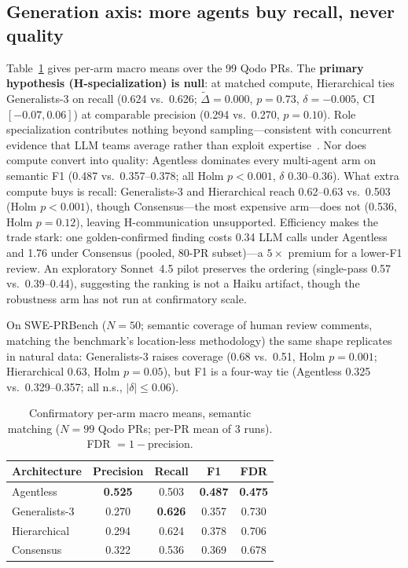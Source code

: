 \documentclass[conference]{IEEEtran}
\begin{document}
\subsection{Generation axis: more agents buy recall, never quality}
\label{sec:generation}
Table~\ref{tab:confirmatory} gives per-arm macro means over the 99 Qodo
PRs. The \textbf{primary hypothesis (H-specialization) is null}: at
matched compute, Hierarchical ties Generalists-3 on recall (0.624 vs.\
0.626; $\tilde\Delta{=}0.000$, $p{=}0.73$, $\delta{=}{-}0.005$, CI
$[-0.07, 0.06]$) at comparable precision (0.294 vs.\ 0.270, $p{=}0.10$).
Role specialization contributes nothing beyond sampling---consistent with
concurrent evidence that LLM teams average rather than exploit
expertise~\cite{pappu}. Nor does compute convert into quality: Agentless
dominates every multi-agent arm on semantic F1 (0.487 vs.\ 0.357--0.378;
all Holm $p{<}0.001$, $\delta$ 0.30--0.36). What extra compute buys is
recall: Generalists-3 and Hierarchical reach 0.62--0.63 vs.\ 0.503 (Holm
$p{<}0.001$), though Consensus---the most expensive arm---does not (0.536,
Holm $p{=}0.12$), leaving H-communication unsupported. Efficiency makes
the trade stark: one golden-confirmed finding costs 0.34 LLM calls under
Agentless and 1.76 under Consensus (pooled, 80-PR subset)---a $5\times$
premium for a lower-F1 review. An exploratory Sonnet~4.5 pilot preserves
the ordering (single-pass 0.57 vs.\ 0.39--0.44), suggesting the ranking is
not a Haiku artifact, though the robustness arm has not run at
confirmatory scale.

On SWE-PRBench ($N{=}50$; semantic coverage of human review comments,
matching the benchmark's location-less methodology) the same shape
replicates in natural data: Generalists-3 raises coverage (0.68 vs.\ 0.51,
Holm $p{=}0.001$; Hierarchical 0.63, Holm $p{=}0.05$), but F1 is a
four-way tie (Agentless 0.325 vs.\ 0.329--0.357; all n.s.,
$|\delta| \le 0.06$).

\begin{table}[t]
\caption{Confirmatory per-arm macro means, semantic matching ($N{=}99$
Qodo PRs; per-PR mean of 3 runs). FDR $= 1-$precision.}
\label{tab:confirmatory}
\centering
\begin{tabular}{lcccc}
\toprule
Architecture & Precision & Recall & F1 & FDR \\
\midrule
Agentless      & \textbf{0.525} & 0.503 & \textbf{0.487} & \textbf{0.475} \\
Generalists-3  & 0.270 & \textbf{0.626} & 0.357 & 0.730 \\
Hierarchical   & 0.294 & 0.624 & 0.378 & 0.706 \\
Consensus      & 0.322 & 0.536 & 0.369 & 0.678 \\
\bottomrule
\end{tabular}
\end{table}
\end{document}
